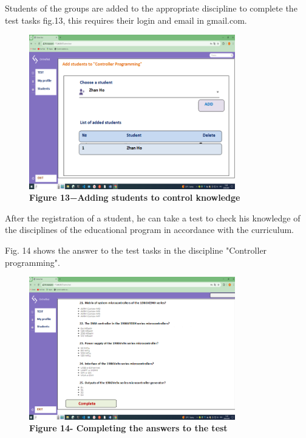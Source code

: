 \begin{multicols}{2}

Students of the groups are added to the appropriate discipline to
complete the test tasks fig.13, this requires their login and email in
gmail.com.
\end{multicols}


\begin{figure}[H]
	\centering
	\includegraphics[width=0.8\textwidth]{assets/138}
	\caption*{\bfseries Figure 13−Adding students to control knowledge}
\end{figure}

\begin{multicols}{2}

After the registration of a student, he can take a test to check his
knowledge of the disciplines of the educational program in accordance
with the curriculum.

Fig. 14 shows the answer to the test tasks in the discipline "Controller
programming".
\end{multicols}


\begin{figure}[H]
	\centering
	\includegraphics[width=0.8\textwidth]{assets/139}
	\caption*{\bfseries Figure 14- Completing the answers to the test}
\end{figure}


